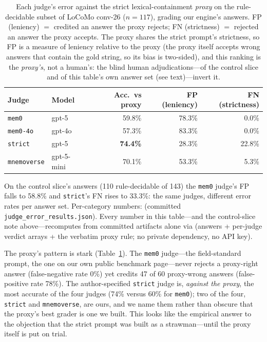 \documentclass[11pt]{article}
\begin{document}
\begin{table}[t]
\centering
\caption{Each judge's error against the strict lexical-containment \emph{proxy} on the rule-decidable subset of LoCoMo conv-26 ($n=117$), grading our engine's answers. FP (leniency) $=$ credited an answer the proxy rejects; FN (strictness) $=$ rejected an answer the proxy accepts. The proxy shares the strict prompt's strictness, so FP is a measure of leniency relative to the proxy (the proxy itself accepts wrong answers that contain the gold string, so its bias is two-sided), and this ranking is the \emph{proxy's}, not a human's: the blind human adjudications---of the control slice and of this table's own answer set (see text)---invert it.}
\label{tab:judge-error}
\small
\begin{tabular}{@{}llrrr@{}}
\toprule
Judge & Model & Acc.\ vs proxy & FP (leniency) & FN (strictness) \\
\midrule
\texttt{mem0}       & gpt-5      & 59.8\%          & 78.3\% & 0.0\% \\
\texttt{mem0-4o}    & gpt-4o     & 57.3\%          & 83.3\% & 0.0\% \\
\texttt{strict}     & gpt-5      & \textbf{74.4\%} & 28.3\% & 22.8\% \\
\texttt{mnemoverse} & gpt-5-mini & 70.1\%          & 53.3\% & 5.3\% \\
\bottomrule
\end{tabular}

\vspace{2pt}
{\footnotesize On the control slice's answers (110 rule-decidable of 143) the \texttt{mem0} judge's FP falls to 58.8\% and \texttt{strict}'s FN rises to 33.3\%: the same judges, different error rates per answer set. Per-category numbers:  (committed \texttt{judge\_error\_results.json}). Every number in this table---and the control-slice note above---recomputes from committed artifacts alone via  (answers + per-judge verdict arrays + the verbatim proxy rule; no private dependency, no API key).}
\end{table}

The proxy's pattern is stark (Table~\ref{tab:judge-error}). The \texttt{mem0} judge---the field-standard prompt, the one on our own public benchmark page---never rejects a proxy-right answer (false-negative rate 0\%) yet credits 47 of 60 proxy-wrong answers (false-positive rate 78\%). The author-specified \texttt{strict} judge is, \emph{against the proxy}, the most accurate of the four judges (74\% versus 60\% for \texttt{mem0}); two of the four, \texttt{strict} and \texttt{mnemoverse}, are ours, and we name them rather than obscure that the proxy's best grader is one we built. This looks like the empirical answer to the objection that the strict prompt was built as a strawman---until the proxy itself is put on trial.
\end{document}
